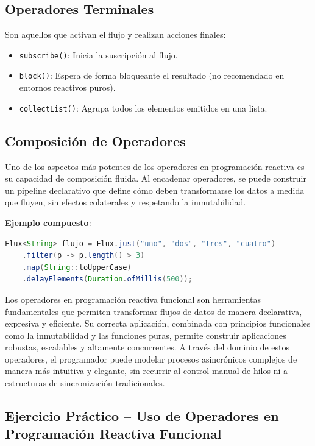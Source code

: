 \subsection{Operadores Terminales}

Son aquellos que activan el flujo y realizan acciones finales:

\begin{itemize}
    \item \texttt{subscribe()}: Inicia la suscripción al flujo.
    \item \texttt{block()}: Espera de forma bloqueante el resultado (no recomendado en entornos reactivos puros).
    \item \texttt{collectList()}: Agrupa todos los elementos emitidos en una lista.
\end{itemize}

\subsection{Composición de Operadores}

Uno de los aspectos más potentes de los operadores en programación reactiva es su capacidad de composición fluida. Al encadenar operadores, se puede construir un pipeline declarativo que define cómo deben transformarse los datos a medida que fluyen, sin efectos colaterales y respetando la inmutabilidad.

\textbf{Ejemplo compuesto}:

\begin{lstlisting}[language=Java]
Flux<String> flujo = Flux.just("uno", "dos", "tres", "cuatro")
    .filter(p -> p.length() > 3)
    .map(String::toUpperCase)
    .delayElements(Duration.ofMillis(500));
\end{lstlisting}

Los operadores en programación reactiva funcional son herramientas fundamentales que permiten transformar flujos de datos de manera declarativa, expresiva y eficiente. Su correcta aplicación, combinada con principios funcionales como la inmutabilidad y las funciones puras, permite construir aplicaciones robustas, escalables y altamente concurrentes. A través del dominio de estos operadores, el programador puede modelar procesos asincrónicos complejos de manera más intuitiva y elegante, sin recurrir al control manual de hilos ni a estructuras de sincronización tradicionales.

\subsection{Ejercicio Práctico – Uso de Operadores en Programación Reactiva Funcional}

